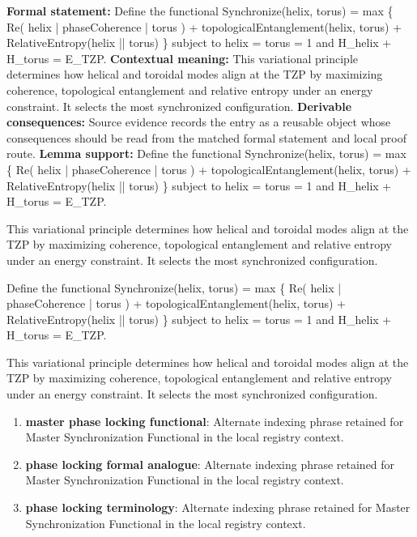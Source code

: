\begingroup\footnotesize\setlength{\emergencystretch}{3em}\sloppy
\textbf{Formal statement:} Define the functional Synchronize(helix, torus) = max \{ Re( helix | phaseCoherence | torus ) + topologicalEntanglement(helix, torus) + RelativeEntropy(helix || torus) \} subject to  helix  =  torus  = 1 and H\_helix + H\_torus = E\_TZP.
\textbf{Contextual meaning:} This variational principle determines how helical and toroidal modes align at the TZP by maximizing coherence, topological entanglement and relative entropy under an energy constraint. It selects the most synchronized configuration.
\textbf{Derivable consequences:} Source evidence records the entry as a reusable object whose consequences should be read from the matched formal statement and local proof route.
\textbf{Lemma support:} Define the functional Synchronize(helix, torus) = max \{ Re( helix | phaseCoherence | torus ) + topologicalEntanglement(helix, torus) + RelativeEntropy(helix || torus) \} subject to  helix  =  torus  = 1 and H\_helix + H\_torus = E\_TZP.\par
\endgroup

This variational principle determines how helical and toroidal modes align at the TZP by maximizing coherence, topological entanglement and relative entropy under an energy constraint. It selects the most synchronized configuration.

Define the functional Synchronize(helix, torus) = max \{ Re( helix | phaseCoherence | torus ) + topologicalEntanglement(helix, torus) + RelativeEntropy(helix || torus) \} subject to  helix  =  torus  = 1 and H\_helix + H\_torus = E\_TZP.

This variational principle determines how helical and toroidal modes align at the TZP by maximizing coherence, topological entanglement and relative entropy under an energy constraint. It selects the most synchronized configuration.
\endgroup

\begin{enumerate}[leftmargin=1.6em,itemsep=6pt,topsep=4pt]
\item \textbf{master phase locking functional}: Alternate indexing phrase retained for Master Synchronization Functional in the local registry context.
\item \textbf{phase locking formal analogue}: Alternate indexing phrase retained for Master Synchronization Functional in the local registry context.
\item \textbf{phase locking terminology}: Alternate indexing phrase retained for Master Synchronization Functional in the local registry context.
\end{enumerate}

